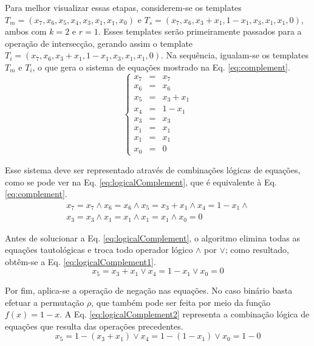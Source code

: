 Para melhor visualizar essas etapas, considerem-se os templates $T_m = (x_7, x_6, x_5, x_4, x_3, x_1, x_1, x_0)$ e $T_s = (x_7, x_6, x_3 + x_1, 1 - x_1, x_3, x_1, x_1, 0)$, ambos com $k=2$ e $r=1$. Esses templates serão primeiramente passados para a operação de intersecção, gerando assim o template $T_i = (x_7, x_6, x_3 + x_1, 1 - x_1, x_3, x_1, x_1, 0)$. Na sequência, igualam-se os templates $T_m$ e $T_i$, o que gera o sistema de equações mostrado na Eq. \eqref{eq:complement}.
\begin{equation}
\left\{\begin{matrix}
x_7 & = & x_7	\\ 
x_6 & = & x_6	\\ 
x_5 & = & x_3 + x_1	\\ 
x_4 & = & 1 - x_1 \\ 
x_3 & = & x_3	\\ 
x_1 & = & x_1	\\ 
x_1 & = & x_1	\\ 
x_0 & = & 0
\end{matrix}\right.
\label{eq:complement}
\end{equation}

Esse sistema deve ser representado através de combinações lógicas de equações, como se pode ver na Eq. \eqref{eq:logicalComplement}, que é equivalente à Eq. \eqref{eq:complement}.
\begin{equation}
\begin{split}
x_7 = x_7	\wedge  
x_6 = x_6	\wedge  
x_5 = x_3 + x_1	\wedge  
x_4 =   1 - x_1 \wedge  \\
x_3 = x_3	\wedge  
x_1 = x_1	\wedge  
x_1 = x_1	\wedge  
x_0 = 0
\end{split}
\label{eq:logicalComplement}
\end{equation}

Antes de solucionar a Eq. \eqref{eq:logicalComplement}, o algoritmo elimina todas as equações tautológicas e troca todo operador lógico $\wedge$ por $\vee$; como resultado, obtêm-se a Eq. \eqref{eq:logicalComplement1}.
\begin{equation}
x_5 = x_3 + x_1 \vee x_4 = 1 - x_1 \vee x_0 = 0
\label{eq:logicalComplement1}
\end{equation}

Por fim,  aplica-se a operação de negação nas equações. No caso binário basta efetuar a permutação $\rho$, que também pode ser feita por meio da função $f(x) = 1 - x$. A Eq. \eqref{eq:logicalComplement2} representa a combinação lógica de equações que resulta das operações precedentes.
\begin{equation}
x_5 = 1 - (x_3 + x_1) \vee x_4 = 1 - (1 - x_1) \vee x_0 = 1 - 0
\label{eq:logicalComplement2}
\end{equation}

